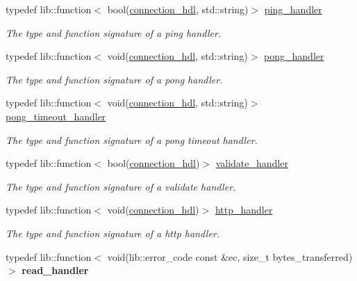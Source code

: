 \begin{DoxyCompactItemize}
typedef lib\+::function$<$ bool(\hyperlink{namespacewebsocketpp_a6b3d26a10ee7229b84b776786332631d}{connection\+\_\+hdl}, std\+::string)$>$ \hyperlink{namespacewebsocketpp_a9dcaaa7370865f1bcacb55ae715793ef}{ping\+\_\+handler}
\begin{DoxyCompactList}\small\item\em The type and function signature of a ping handler. \end{DoxyCompactList}\item 
typedef lib\+::function$<$ void(\hyperlink{namespacewebsocketpp_a6b3d26a10ee7229b84b776786332631d}{connection\+\_\+hdl}, std\+::string)$>$ \hyperlink{namespacewebsocketpp_a1798d54e6d98a481cf870091af84bc1f}{pong\+\_\+handler}
\begin{DoxyCompactList}\small\item\em The type and function signature of a pong handler. \end{DoxyCompactList}\item 
typedef lib\+::function$<$ void(\hyperlink{namespacewebsocketpp_a6b3d26a10ee7229b84b776786332631d}{connection\+\_\+hdl}, std\+::string)$>$ \hyperlink{namespacewebsocketpp_a2c5925a111b9e553efebea35d5ea155f}{pong\+\_\+timeout\+\_\+handler}
\begin{DoxyCompactList}\small\item\em The type and function signature of a pong timeout handler. \end{DoxyCompactList}\item 
typedef lib\+::function$<$ bool(\hyperlink{namespacewebsocketpp_a6b3d26a10ee7229b84b776786332631d}{connection\+\_\+hdl})$>$ \hyperlink{namespacewebsocketpp_ae28f3fed86a59b1998746694f3d4edbd}{validate\+\_\+handler}
\begin{DoxyCompactList}\small\item\em The type and function signature of a validate handler. \end{DoxyCompactList}\item 
typedef lib\+::function$<$ void(\hyperlink{namespacewebsocketpp_a6b3d26a10ee7229b84b776786332631d}{connection\+\_\+hdl})$>$ \hyperlink{namespacewebsocketpp_a37bc4d5b3b21d3bb494d8a23236315d2}{http\+\_\+handler}
\begin{DoxyCompactList}\small\item\em The type and function signature of a http handler. \end{DoxyCompactList}\item 
typedef lib\+::function$<$ void(lib\+::error\+\_\+code const \&ec, size\+\_\+t bytes\+\_\+transferred)$>$ {\bfseries read\+\_\+handler}\hypertarget{namespacewebsocketpp_a6fb3f66d640c365795dcc01a7f87c900}{}\label{namespacewebsocketpp_a6fb3f66d640c365795dcc01a7f87c900}


\end{DoxyCompactItemize}
